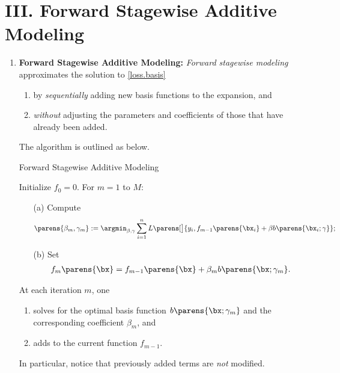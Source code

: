 \documentclass[12pt]{article}
\begin{document}
\section*{III. Forward Stagewise Additive Modeling}

\begin{enumerate}[label=\textbf{\arabic*.}]

	\item \textbf{Forward Stagewise Additive Modeling:} \emph{Forward stagewise modeling} approximates the solution to \eqref{loss.basis} 
	\begin{enumerate}
		\item by \textit{sequentially} adding new basis functions to the expansion, and 
		\item \textit{without} adjusting the parameters and coefficients of those that have already been added. 
	\end{enumerate}
	
	The algorithm is outlined as below. 

	\begin{minipage}{\linewidth}
		\begin{algorithm}[H]
		\caption{Forward Stagewise Additive Modeling}\label{algo-forward-stagewise-additive}
			\begin{algorithmic}[1]
				\STATE Initialize $f_0 = 0$. 
				\STATE For $m = 1$ to $M$: 
				\begin{enumerate}
					\item[(a)] Compute
					\begin{align*}
						\parens{\beta_m, \gamma_m} := \argmin_{\beta, \gamma} \sum_{i=1}^n L \parens[\big]{y_i, f_{m-1} \parens{\bx_i} + \beta b \parens{\bx_i; \gamma}}; 
					\end{align*}
					\item[(b)] Set 
					\begin{align*}
						f_m \parens{\bx} = f_{m-1} \parens{\bx} + \beta_m b \parens{\bx; \gamma_m}. 
					\end{align*}
				\end{enumerate}
			\end{algorithmic}
		\end{algorithm}
	\end{minipage}
	
	\vspace{5pt}
	At each iteration $m$, one 
	\begin{enumerate}
		\item solves for the optimal basis function $b \parens{\bx; \gamma_m}$ and the corresponding coefficient $\beta_m$, and 
		\item adds to the current function $f_{m-1}$. 
	\end{enumerate}
	In particular, notice that previously added terms are \emph{not} modified. 
	

\end{enumerate}
\end{document}
